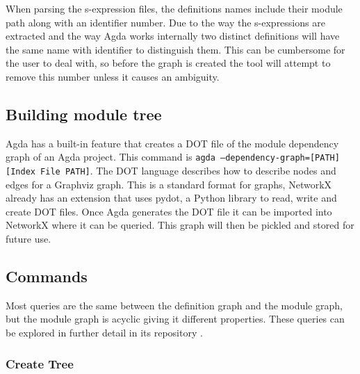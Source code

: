 When parsing the s-expression files, the definitions names include their module
path along with an identifier number. Due to the way the s-expressions are
extracted and the way Agda works internally two distinct definitions will have
the same name with identifier to distinguish them. This can be cumbersome for
the user to deal with, so before the graph is created the tool will attempt to
remove this number unless it causes an ambiguity.

\subsection{Building module tree} \label{sub: Building Module Tree}


Agda has a built-in feature that creates a DOT file of the module dependency
graph of an Agda project. This command is \texttt{agda
--dependency-graph=[PATH] [Index File PATH]}. The DOT language describes how to
describe nodes and edges for a Graphviz graph. This is a standard format for
graphs, NetworkX already has an extension that uses pydot, a Python library to
read, write and create DOT files. Once Agda generates the DOT file it can be
imported into NetworkX where it can be queried. This graph will then be
pickled and stored for future use.


\subsection{Commands}

Most queries are the same between the definition graph and the module graph,
but the module graph is acyclic giving it different properties. These queries
can be explored in further detail in its repository \cite{agda_html}.


\subsubsection{Create Tree}

